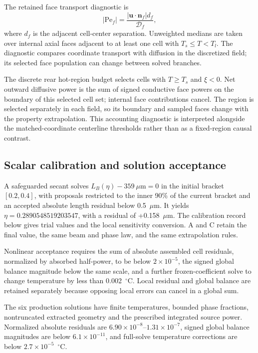 \documentclass[preprint,12pt]{elsarticle}
\newcommand{\um}{\ensuremath{\mu\mathrm{m}}}
\begin{document}
The retained face transport diagnostic is
\begin{equation}
 |\mathrm{Pe}_f|=\frac{|\bm u\cdot\bm n_f|d_f}{\mathcal D_f},
 \label{eq:pe}
\end{equation}
where $d_f$ is the adjacent cell-center separation. Unweighted medians are taken over internal axial faces adjacent to at least one cell with $T_s\leq T<T_l$. The diagnostic compares coordinate transport with diffusion in the discretized field; its selected face population can change between solved branches.

The discrete rear hot-region budget selects cells with $T\geq T_s$ and $\xi<0$. Net outward diffusive power is the sum of signed conductive face powers on the boundary of this selected cell set; internal face contributions cancel. The region is selected separately in each field, so its boundary and sampled faces change with the property extrapolation. This accounting diagnostic is interpreted alongside the matched-coordinate centerline thresholds rather than as a fixed-region causal contrast.

\subsection{Scalar calibration and solution acceptance}
A safeguarded secant solves $L_B(\eta)-359~\um=0$ in the initial bracket $[0.2,0.4]$, with proposals restricted to the inner 90\% of the current bracket and an accepted absolute length residual below 0.5~\um. It yields $\eta=0.2890548519203547$, with a residual of +0.158~\um. The calibration record below gives trial values and the local sensitivity conversion. A and C retain the final value, the same beam and phase law, and the same extrapolation rules.

Nonlinear acceptance requires the sum of absolute assembled cell residuals, normalized by absorbed half-power, to be below $2\times10^{-5}$, the signed global balance magnitude below the same scale, and a further frozen-coefficient solve to change temperature by less than 0.002~$^\circ$C. Local residual and global balance are retained separately because opposing local errors can cancel in a global sum.

The six production solutions have finite temperatures, bounded phase fractions, nontruncated extracted geometry and the prescribed integrated source power. Normalized absolute residuals are $6.90\times10^{-8}$--$1.31\times10^{-7}$, signed global balance magnitudes are below $6.1\times10^{-11}$, and full-solve temperature corrections are below $2.7\times10^{-5}$~$^\circ$C.
\end{document}
